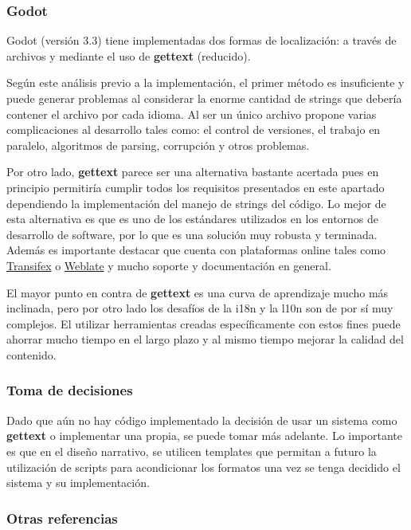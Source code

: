 \subsubsection{Godot}\label{i18n:i18n-godot}
Godot (versión 3.3) tiene implementadas dos formas de localización: a través de archivos  y mediante el uso de \textbf{gettext} (reducido).

Según este análisis previo a la implementación, el primer método es insuficiente y puede generar problemas al considerar la enorme cantidad de strings que debería contener el archivo  por cada idioma. Al ser un único archivo propone varias complicaciones al desarrollo tales como: el control de versiones, el trabajo en paralelo, algoritmos de parsing, corrupción y otros problemas.

Por otro lado, \textbf{gettext} parece ser una alternativa bastante acertada pues en principio permitiría cumplir todos los requisitos presentados en este apartado dependiendo la implementación del manejo de strings del código. Lo mejor de esta alternativa es que es uno de los estándares utilizados en los entornos de desarrollo de software, por lo que es una solución muy robusta y terminada. Además es importante destacar que cuenta con plataformas online tales como \href{https://www.transifex.com/}{Transifex} o \href{https://weblate.org}{Weblate} y mucho soporte y documentación en general.

El mayor punto en contra de \textbf{gettext} es una curva de aprendizaje mucho más inclinada, pero por otro lado los desafíos de la i18n y la l10n son de por sí muy complejos. El utilizar herramientas creadas específicamente con estos fines puede ahorrar mucho tiempo en el largo plazo y al mismo tiempo mejorar la calidad del contenido.

\subsubsection{Toma de decisiones}\label{i18n:decisiones-i18n}
Dado que aún no hay código implementado la decisión de usar un sistema como \textbf{gettext} o implementar una  propia, se puede tomar más adelante. Lo importante es que en el diseño narrativo, se utilicen templates que permitan a futuro la utilización de scripts para acondicionar los formatos una vez se tenga decidido el sistema y su implementación.

\subsubsection{Otras referencias}\label{i18n:otras-referencias}


